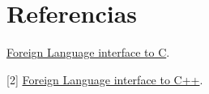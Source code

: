 \documentclass[a4paper,12pt]{article}
\begin{document}
\section{Referencias}
\begin{flushleft}
[1] \href{http://www.swi-prolog.org/pldoc/man?section=foreign}{Foreign Language interface to C}.

[2] \href{http://www.swi-prolog.org/pldoc/doc_for?object=section('packages/pl2cpp.html')}{Foreign Language interface to C++}.\\
\end{flushleft}
\end{document}

